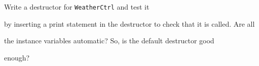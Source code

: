 Write a destructor for \texttt{WeatherCtrl} and test it

by inserting a print statement in the destructor to check that it is called. Are all

the instance variables automatic? So, is the default destructor good

enough?

